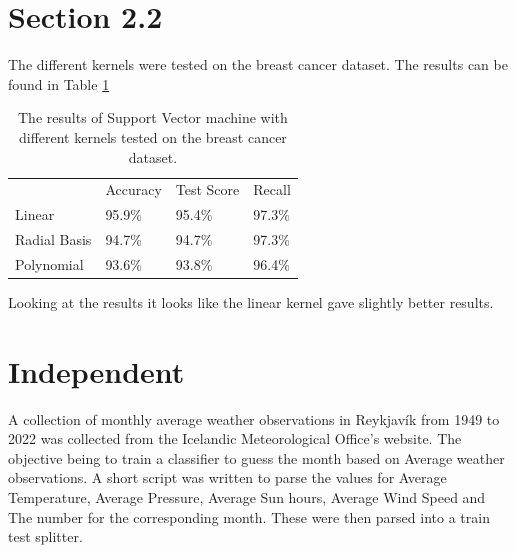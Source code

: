 \documentclass{article}
\begin{document}
\section*{Section 2.2}
The different kernels were tested on the breast cancer dataset. The results can be found in Table \ref{tab:22}
\begin{table}[H]
\centering
\begin{tabular}{llll}
             & Accuracy & Test Score & Recall \\
Linear       & 95.9\%   & 95.4\%     & 97.3\% \\
Radial Basis & 94.7\%   & 94.7\%     & 97.3\% \\
Polynomial   & 93.6\%   & 93.8\%     & 96.4\%
\end{tabular}
\caption{The results of Support Vector machine with different kernels tested on the breast cancer dataset.}
\label{tab:22}
\end{table}
Looking at the results it looks like the linear kernel gave slightly better results.


\section*{Independent}
A collection of monthly average weather observations in Reykjavík from 1949 to 2022 was collected from the Icelandic Meteorological Office's website. The objective being to train a classifier to guess the month based on Average weather observations. A short script was written to parse the values for Average Temperature, Average Pressure, Average Sun hours, Average Wind Speed and The number for the corresponding month. These were then parsed into a train test splitter. 
\end{document}
